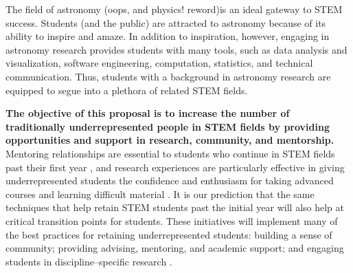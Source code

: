 \documentclass[12pt]{article}
\begin{document}





The field of astronomy (oops, and physics! reword)is an ideal gateway to STEM success.  Students (and the public) are attracted to astronomy because of its ability to inspire and amaze.  In addition to inspiration, however, engaging in astronomy research provides students with many tools, such as data analysis and visualization, software engineering, computation, statistics, and technical communication.  Thus, students with a background in astronomy research are equipped to segue into a plethora of related STEM fields.
	
{\bf The objective of this proposal is to increase the number of traditionally underrepresented people in STEM fields by providing opportunities and support in research, community, and mentorship.} Mentoring relationships are essential to students who continue in STEM fields past their first year \citep{reureport,Nagda,Wilson}, and research experiences are particularly effective in giving underrepresented students the confidence and enthusiasm for taking advanced courses and learning difficult material \citep{armstrong03}. It is our prediction that the same techniques that help retain STEM students past the initial year will also help at critical transition points for students. These initiatives will implement many of the best practices for retaining underrepresented students:  building a sense of community; providing advising, mentoring, and academic support; and engaging students in discipline--specific research \citep{jordan,holland}. 	
\end{document}
